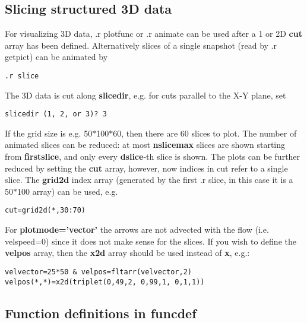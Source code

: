 \subsection{Slicing structured 3D data \label{s-slice}}

   For visualizing 3D data, .r plotfunc or .r animate can be used after a
   1 or 2D {\bf cut} array has been defined. Alternatively slices of a single
   snapshot (read by .r getpict) can be animated by
\begin{verbatim}
.r slice
\end{verbatim}
   The 3D data is cut along {\bf slicedir}, e.g. for cuts parallel to the
   X-Y plane, set
\begin{verbatim}
slicedir (1, 2, or 3)? 3
\end{verbatim}
   If the grid size is e.g. 50$*$100$*$60, then there are 60 slices to plot.
   The number of animated slices can be reduced:
   at most {\bf nslicemax} slices are shown starting from {\bf firstslice},
   and only every {\bf dslice}-th slice is shown.
   The plots can be further reduced by setting the {\bf cut} array,
   however, now indices in cut refer to a single slice. The {\bf grid2d} 
   index array (generated by the first .r slice, in this case it is a 50$*$100 
   array) can be used, e.g.
\begin{verbatim}
cut=grid2d(*,30:70)
\end{verbatim}
   For {\bf plotmode='vector'} the arrows are not advected with the flow 
   (i.e. velspeed=0) since it does not make sense for the slices.
   If you wish to define the {\bf velpos} array, then the 
   {\bf x2d} array should be used instead of {\bf x}, e.g.:
\begin{verbatim}
velvector=25*50 & velpos=fltarr(velvector,2)
velpos(*,*)=x2d(triplet(0,49,2, 0,99,1, 0,1,1))
\end{verbatim}

\subsection{Function definitions in funcdef \label{s-funcdef}}

